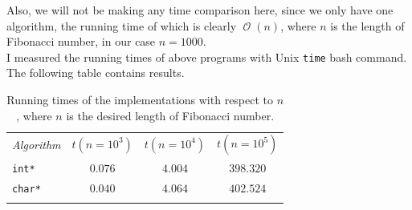 \documentclass{book}
\DeclareMathOperator{\bigo}{\mathcal{O}}
\begin{document}
Also, we will not be making any time comparison here, since we only have one algorithm, the running time of which is clearly $\bigo(n)$, where $n$ is the length of Fibonacci number, in our case $n = 1000$.\\

I measured the running times of above programs with Unix \texttt{time} bash command. The following table contains results.

\begin{table}[h!]
\centering
\begin{tabular}{||l||c|c|c||}
\hhline{|t:====:t|}
\textit{Algorithm} & $t(n=10^3)$ & $t(n=10^4)$ & $t(n=10^5)$\\ \hhline{||=||=|=|=||}
\texttt{int*} & $0.076$ & $4.004$ & $398.320$ \\ \hhline{||-||-|-|-||}
\texttt{char*} & $0.040$ & $4.064$ & $402.524$ \\ \hhline{|b:====:b|}
\end{tabular}
\caption{Running times of the implementations with respect to $n$, where $n$ is the desired length of Fibonacci number.} 
\end{table}
\end{document}
